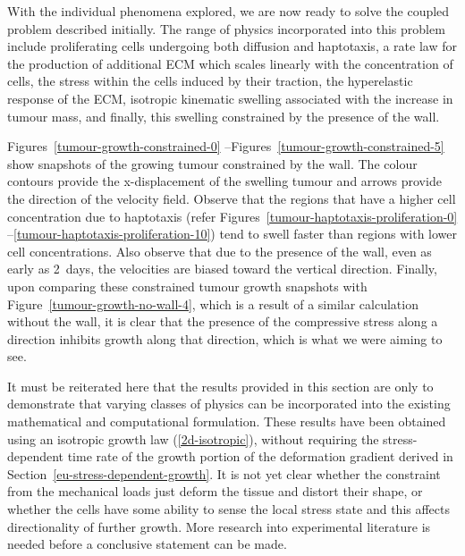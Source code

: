 With the individual phenomena explored, we are now ready to solve
the coupled problem described initially. The range of physics
incorporated into this problem include proliferating cells undergoing
both diffusion and haptotaxis, a rate law for the production of
additional ECM which scales linearly with the concentration of
cells, the stress within the cells induced by their traction, the
hyperelastic response of the ECM, isotropic kinematic swelling
associated with the increase in tumour mass, and finally, this
swelling constrained by the presence of the wall.

Figures~\ref{tumour-growth-constrained-0}%
--Figures~\ref{tumour-growth-constrained-5} show snapshots of the
growing tumour constrained by the wall. The colour contours provide
the x-displacement of the swelling tumour and arrows provide the
direction of the velocity field. Observe that the regions that have a
higher cell concentration due to haptotaxis (refer
Figures~\ref{tumour-haptotaxis-proliferation-0}%
--\ref{tumour-haptotaxis-proliferation-10}) tend to swell faster than
regions with lower cell concentrations. Also observe that due to the
presence of the wall, even as early as 2~days, the velocities are
biased toward the vertical direction. Finally, upon comparing these
constrained tumour growth snapshots with
Figure~\ref{tumour-growth-no-wall-4}, which is a result of a similar
calculation without the wall, it is clear that the presence of the
compressive stress along a direction inhibits growth along that
direction, which is what we were aiming to see.

\vspace{1 cm} %

It must be reiterated here that the results provided in this section
are only to demonstrate that varying classes of physics can be
incorporated into the existing mathematical and computational
formulation. These results have been obtained using an isotropic
growth law (\ref{2d-isotropic}), without requiring the
stress-dependent time rate of the growth portion of the deformation
gradient derived in Section~\ref{eu-stress-dependent-growth}. It is
not yet clear whether the constraint from the mechanical loads just
deform the tissue and distort their shape, or whether the cells have
some ability to sense the local stress state and this affects
directionality of further growth. More research into experimental
literature is needed before a conclusive statement can be made.

\vspace{1cm} %

